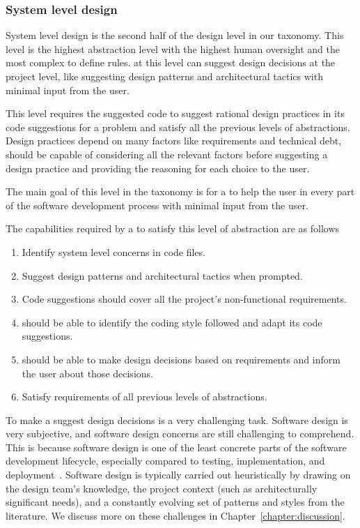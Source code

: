 \subsubsection{System level design}
\label{high_design}
System level design is the second half of the design level in our taxonomy. This level is the highest abstraction level with the highest human oversight and the most complex to define rules.
\cct{} at this level can suggest design decisions at the project level, like suggesting design patterns and architectural tactics with minimal input from the user.

This level requires the suggested code to suggest rational design practices in its code suggestions for a problem and satisfy all the previous levels of abstractions. Design practices depend on many factors like requirements and technical debt, \cct{} should be capable of considering all the relevant factors before suggesting a design practice and providing the reasoning for each choice to the user.

The main goal of this level in the taxonomy is for a \cct{} to help the user in every part of the software development process with minimal input from the user.

The capabilities required by a \cct{} to satisfy this level of abstraction are as follows
\begin{enumerate}
    \item Identify system level concerns in code files.
    \item Suggest design patterns and architectural tactics when prompted.
    \item Code suggestions should cover all the project's non-functional requirements.
    \item \cct{} should be able to identify the coding style followed and adapt its code suggestions.
    \item \cct{} should be able to make design decisions based on requirements and inform the user about those decisions.
    \item Satisfy requirements of all previous levels of abstractions.
\end{enumerate}

To make a \cct{} suggest design decisions is a very challenging task. 
Software design is very subjective, and software design concerns are still challenging to comprehend. 
This is because software design is one of the least concrete parts of the software development lifecycle, especially compared to testing, implementation, and deployment~\cite{sedesign}. 
Software design is typically carried out heuristically by drawing on the design team's knowledge, the project context (such as architecturally significant needs), and a constantly evolving set of patterns and styles from the literature. We discuss more on these challenges in Chapter~\ref{chapter:discussion}.